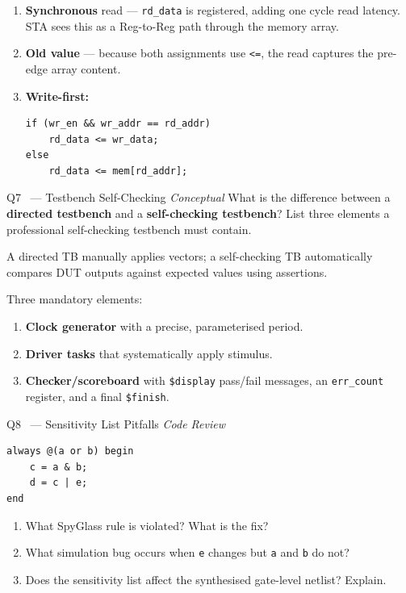 \documentclass[12pt,a4paper]{article}
\newcommand{\advanced}{%
  \fbox{\textcolor{advred}{\bfseries\sffamily\small ADVANCED}}}
\newcommand{\moderate}{%
  \fbox{\textcolor{modoran}{\bfseries\sffamily\small MODERATE}}}
\begin{document}
\begin{answerbox}
\begin{enumerate}[label=\textbf{\alph*)}]
  \item \textbf{Synchronous} read --- \texttt{rd\_data} is registered, adding one cycle read latency. STA sees this as a Reg-to-Reg path through the memory array.
  \item \textbf{Old value} --- because both assignments use \texttt{<=}, the read captures the pre-edge array content.
  \item \textbf{Write-first:}
\begin{lstlisting}[style=verilogstyle]
if (wr_en && wr_addr == rd_addr)
    rd_data <= wr_data;
else
    rd_data <= mem[rd_addr];
\end{lstlisting}
\end{enumerate}
\end{answerbox}

\begin{questionbox}{Q7 \moderate\ --- Testbench Self-Checking \hfill\textit{Conceptual}}
What is the difference between a \textbf{directed testbench} and a \textbf{self-checking testbench}? List three elements a professional self-checking testbench must contain.
\end{questionbox}

\begin{answerbox}
A directed TB manually applies vectors; a self-checking TB automatically compares DUT outputs against expected values using assertions.

Three mandatory elements:
\begin{enumerate}
  \item \textbf{Clock generator} with a precise, parameterised period.
  \item \textbf{Driver tasks} that systematically apply stimulus.
  \item \textbf{Checker/scoreboard} with \texttt{\$display} pass/fail messages, an \texttt{err\_count} register, and a final \texttt{\$finish}.
\end{enumerate}
\end{answerbox}

\begin{questionbox}{Q8 \advanced\ --- Sensitivity List Pitfalls \hfill\textit{Code Review}}

\begin{lstlisting}[style=verilogstyle]
always @(a or b) begin
    c = a & b;
    d = c | e;
end
\end{lstlisting}

\begin{enumerate}[label=\textbf{\alph*)}]
  \item What SpyGlass rule is violated? What is the fix?
  \item What simulation bug occurs when \texttt{e} changes but \texttt{a} and \texttt{b} do not?
  \item Does the sensitivity list affect the synthesised gate-level netlist? Explain.
\end{enumerate}
\end{questionbox}
\end{document}
